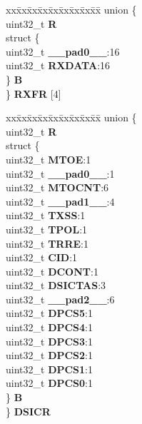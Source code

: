 \begin{DoxyCompactItemize}
\begin{tabbing}
\end{tabbing}\item 
\mbox{\label{structDSPI__tag_a38d807b97c7d0e91298fe27fb7e7fcf0}} 
\begin{tabbing}
xx\=xx\=xx\=xx\=xx\=xx\=xx\=xx\=xx\=\kill
union \{\\
\>uint32\_t {\bfseries R}\\
\>struct \{\\
\>\>uint32\_t {\bfseries \_\_pad0\_\_}:16\\
\>\>uint32\_t {\bfseries RXDATA}:16\\
\>\} {\bfseries B}\\
\} {\bfseries RXFR} \mbox{[}4\mbox{]}\\

\end{tabbing}\item 
\mbox{\label{structDSPI__tag_a73051ca5f94a5b76c024ea6aed1da3a0}} 
\begin{tabbing}
xx\=xx\=xx\=xx\=xx\=xx\=xx\=xx\=xx\=\kill
union \{\\
\>uint32\_t {\bfseries R}\\
\>struct \{\\
\>\>uint32\_t {\bfseries MTOE}:1\\
\>\>uint32\_t {\bfseries \_\_pad0\_\_}:1\\
\>\>uint32\_t {\bfseries MTOCNT}:6\\
\>\>uint32\_t {\bfseries \_\_pad1\_\_}:4\\
\>\>uint32\_t {\bfseries TXSS}:1\\
\>\>uint32\_t {\bfseries TPOL}:1\\
\>\>uint32\_t {\bfseries TRRE}:1\\
\>\>uint32\_t {\bfseries CID}:1\\
\>\>uint32\_t {\bfseries DCONT}:1\\
\>\>uint32\_t {\bfseries DSICTAS}:3\\
\>\>uint32\_t {\bfseries \_\_pad2\_\_}:6\\
\>\>uint32\_t {\bfseries DPCS5}:1\\
\>\>uint32\_t {\bfseries DPCS4}:1\\
\>\>uint32\_t {\bfseries DPCS3}:1\\
\>\>uint32\_t {\bfseries DPCS2}:1\\
\>\>uint32\_t {\bfseries DPCS1}:1\\
\>\>uint32\_t {\bfseries DPCS0}:1\\
\>\} {\bfseries B}\\
\} {\bfseries DSICR}\\


\end{tabbing}
\end{DoxyCompactItemize}
